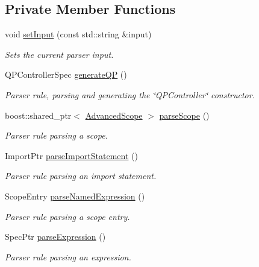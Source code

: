 \subsection*{Private Member Functions}
\begin{DoxyCompactItemize}
\item 
void \hyperlink{classgiskard__suturo_1_1GiskardPPParser_a8e475797a969228c979758e5fb2113d1}{set\-Input} (const std\-::string \&input)
\begin{DoxyCompactList}\small\item\em Sets the current parser input. \end{DoxyCompactList}\item 
Q\-P\-Controller\-Spec \hyperlink{classgiskard__suturo_1_1GiskardPPParser_a8cdfdc1fabf8e37114e87829353c0a28}{generate\-Q\-P} ()
\begin{DoxyCompactList}\small\item\em Parser rule, parsing and generating the \char`\"{}\-Q\-P\-Controller\char`\"{} constructor. \end{DoxyCompactList}\item 
boost\-::shared\-\_\-ptr$<$ \hyperlink{classgiskard__suturo_1_1AdvancedScope}{Advanced\-Scope} $>$ \hyperlink{classgiskard__suturo_1_1GiskardPPParser_a304048c5760494529fbdb1dc350faef1}{parse\-Scope} ()
\begin{DoxyCompactList}\small\item\em Parser rule parsing a scope. \end{DoxyCompactList}\item 
Import\-Ptr \hyperlink{classgiskard__suturo_1_1GiskardPPParser_a4a578fa8cb1146dcfaef6339cbf21191}{parse\-Import\-Statement} ()
\begin{DoxyCompactList}\small\item\em Parser rule parsing an import statement. \end{DoxyCompactList}\item 
Scope\-Entry \hyperlink{classgiskard__suturo_1_1GiskardPPParser_a8468037631a6bd116cdc0fe13b8092e3}{parse\-Named\-Expression} ()
\begin{DoxyCompactList}\small\item\em Parser rule parsing a scope entry. \end{DoxyCompactList}\item 
Spec\-Ptr \hyperlink{classgiskard__suturo_1_1GiskardPPParser_aee7c06ef0abfabde31bcf04ae1adb2ce}{parse\-Expression} ()
\begin{DoxyCompactList}\small\item\em Parser rule parsing an expression. \end{DoxyCompactList}\item 

\end{DoxyCompactItemize}
